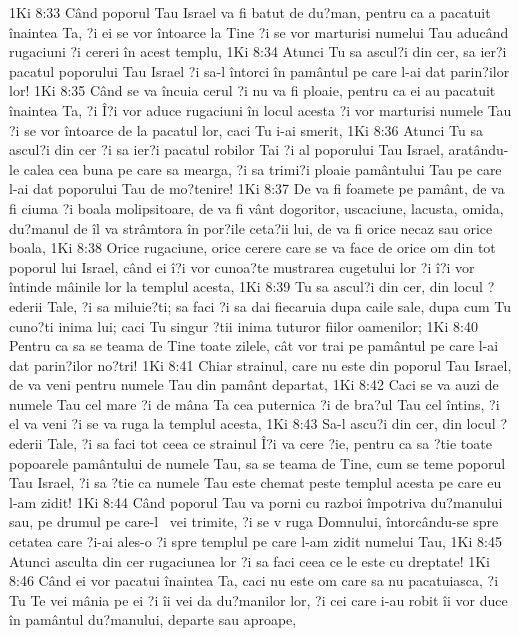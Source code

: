 1Ki 8:33  Când poporul Tau Israel va fi batut de du?man, pentru ca a pacatuit înaintea Ta, ?i ei se vor întoarce la Tine ?i se vor marturisi numelui Tau aducând rugaciuni ?i cereri în acest templu,
1Ki 8:34  Atunci Tu sa ascul?i din cer, sa ier?i pacatul poporului Tau Israel ?i sa-l întorci în pamântul pe care l-ai dat parin?ilor lor!
1Ki 8:35  Când se va încuia cerul ?i nu va fi ploaie, pentru ca ei au pacatuit înaintea Ta, ?i Î?i vor aduce rugaciuni în locul acesta ?i vor marturisi numele Tau ?i se vor întoarce de la pacatul lor, caci Tu i-ai smerit,
1Ki 8:36  Atunci Tu sa ascul?i din cer ?i sa ier?i pacatul robilor Tai ?i al poporului Tau Israel, aratându-le calea cea buna pe care sa mearga, ?i sa trimi?i ploaie pamântului Tau pe care l-ai dat poporului Tau de mo?tenire!
1Ki 8:37  De va fi foamete pe pamânt, de va fi ciuma ?i boala molipsitoare, de va fi vânt dogoritor, uscaciune, lacusta, omida, du?manul de îl va strâmtora în por?ile ceta?ii lui, de va fi orice necaz sau orice boala,
1Ki 8:38  Orice rugaciune, orice cerere care se va face de orice om din tot poporul lui Israel, când ei î?i vor cunoa?te mustrarea cugetului lor ?i î?i vor întinde mâinile lor la templul acesta,
1Ki 8:39  Tu sa ascul?i din cer, din locul ?ederii Tale, ?i sa miluie?ti; sa faci ?i sa dai fiecaruia dupa caile sale, dupa cum Tu cuno?ti inima lui; caci Tu singur ?tii inima tuturor fiilor oamenilor;
1Ki 8:40  Pentru ca sa se teama de Tine toate zilele, cât vor trai pe pamântul pe care l-ai dat parin?ilor no?tri!
1Ki 8:41  Chiar strainul, care nu este din poporul Tau Israel, de va veni pentru numele Tau din pamânt departat,
1Ki 8:42  Caci se va auzi de numele Tau cel mare ?i de mâna Ta cea puternica ?i de bra?ul Tau cel întins, ?i el va veni ?i se va ruga la templul acesta,
1Ki 8:43  Sa-l ascu?i din cer, din locul ?ederii Tale, ?i sa faci tot ceea ce strainul Î?i va cere ?ie, pentru ca sa ?tie toate popoarele pamântului de numele Tau, sa se teama de Tine, cum se teme poporul Tau Israel, ?i sa ?tie ca numele Tau este chemat peste templul acesta pe care eu l-am zidit!
1Ki 8:44  Când poporul Tau va porni cu razboi împotriva du?manului sau, pe drumul pe care-l  vei trimite, ?i se v ruga Domnului, întorcându-se spre cetatea care ?i-ai ales-o ?i spre templul pe care l-am zidit numelui Tau,
1Ki 8:45  Atunci asculta din cer rugaciunea lor ?i sa faci ceea ce le este cu dreptate!
1Ki 8:46  Când ei vor pacatui înaintea Ta, caci nu este om care sa nu pacatuiasca, ?i Tu Te vei mânia pe ei ?i îi vei da du?manilor lor, ?i cei care i-au robit îi vor duce în pamântul du?manului, departe sau aproape,
